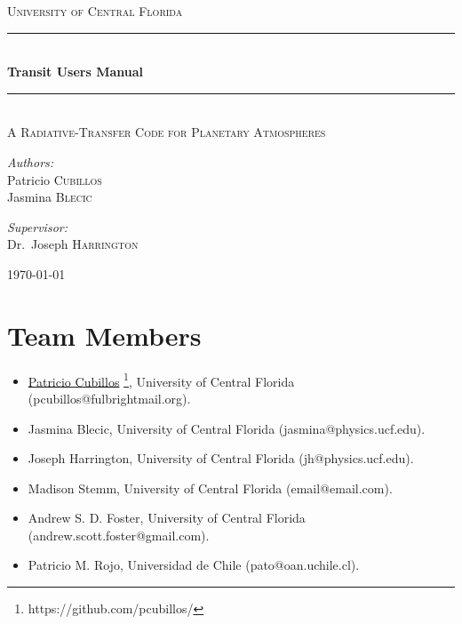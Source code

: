 \documentclass[letterpaper, 12pt]{article}
\begin{document}

\begin{titlepage}
\begin{center}

\textsc{\LARGE University of Central Florida}\\[1.5cm]

\rule{\linewidth}{0.5mm} \\[0.4cm]
{ \huge \bfseries Transit Users Manual \\[0.4cm] }
\rule{\linewidth}{0.5mm} \\[1.0cm]

\textsc{\Large A Radiative-Transfer Code for Planetary Atmospheres}\\[1.5cm]

\noindent
\begin{minipage}{0.4\textwidth}
\begin{flushleft} \large
\emph{Authors:}\\
Patricio \textsc{Cubillos}\\
Jasmina  \textsc{Blecic}  \\
\end{flushleft}
\end{minipage}%
\begin{minipage}{0.4\textwidth}
\begin{flushright} \large
\emph{Supervisor:} \\
Dr.~Joseph \textsc{Harrington}
\end{flushright}
\end{minipage}

\vfill

{\large \today}

\end{center}
\end{titlepage}

\tableofcontents

\newpage

\section{Team Members}
\label{sec:team}

\begin{itemize}
\item \href{https://github.com/pcubillos/}{Patricio Cubillos}%
  \footnote{https://github.com/pcubillos/}, University of
  Central Florida (pcubillos@fulbrightmail.org).
\item Jasmina Blecic, University of Central Florida (jasmina@physics.ucf.edu).
\item Joseph Harrington, University of Central Florida (jh@physics.ucf.edu).
\item Madison Stemm, University of Central Florida (email@email.com).
\item Andrew S. D. Foster, University of Central Florida (andrew.scott.foster@gmail.com).
\item Patricio M. Rojo, Universidad de Chile (pato@oan.uchile.cl).
\end{itemize}
\end{document}
